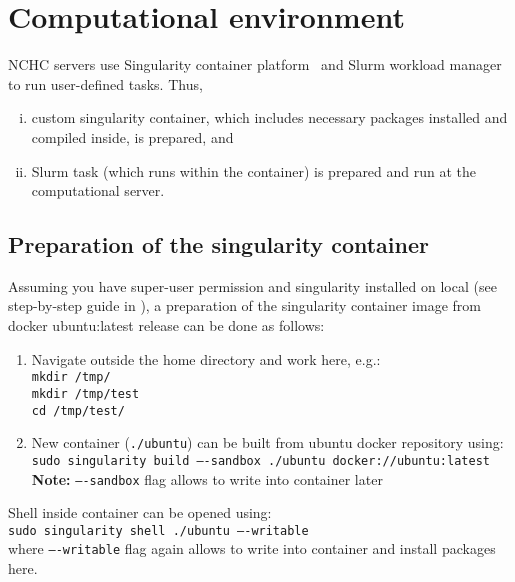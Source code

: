 \cleardoublepage
\section{Computational environment}
\label{sec:env}

NCHC servers use Singularity container platform~\cite{singularity} and Slurm workload manager~\cite{slurm} to run user-defined tasks. Thus,  
\begin{enumerate}[(i)]
    \item custom singularity container, which includes necessary packages installed and compiled inside, is prepared, and
    \item Slurm task (which runs within the container) is prepared and run at the computational server.
\end{enumerate}

\subsection{Preparation of the singularity container}
\label{subsec:prepCont}

Assuming you have super-user permission and singularity installed on local (see step-by-step guide in \cite{singularityInstall}), a preparation of the singularity container image from docker ubuntu:latest release can be done as follows: 
\begin{enumerate}
    \item Navigate outside the home directory and work here, e.g.: \\[0.2cm] 
    \texttt{mkdir /tmp/} \\[0.2cm] 
    \texttt{mkdir /tmp/test} \\[0.2cm] 
    \texttt{cd /tmp/test/} 
    \item New container (\texttt{./ubuntu}) can be built from ubuntu docker repository using:\\[0.2cm] 
    \texttt{sudo singularity build ----sandbox ./ubuntu docker://ubuntu:latest}\\[0.2cm] 
    \textbf{Note:} \texttt{----sandbox} flag allows to write into container later
\end{enumerate}

Shell inside container can be opened using: \\[0.2cm]
\indent\quad\quad\texttt{sudo singularity shell ./ubuntu ----writable} \\[0.2cm]
where \texttt{----writable} flag again allows to write into container and install packages here.

